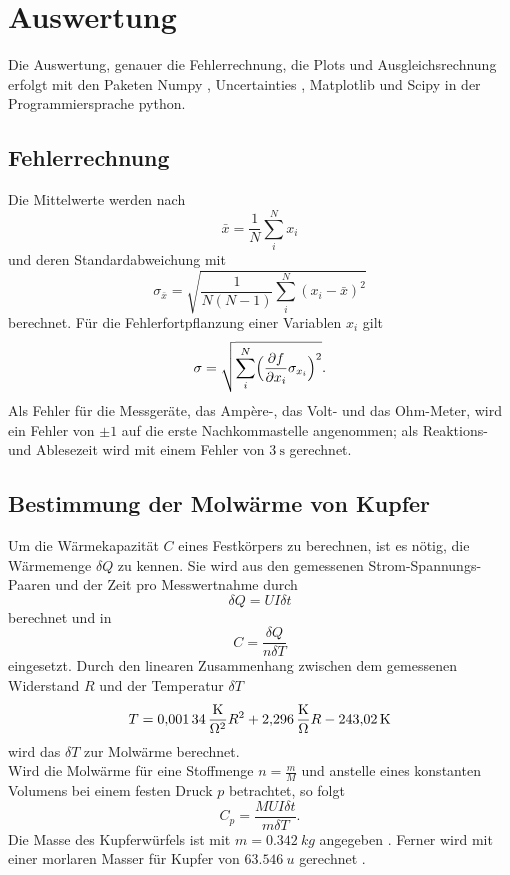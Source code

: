 \section{Auswertung}
Die Auswertung, genauer die Fehlerrechnung, die Plots und Ausgleichsrechnung erfolgt mit den Paketen
Numpy \cite{numpy}, Uncertainties \cite{uncertainties}, Matplotlib \cite{matplotlib} und Scipy \cite{scipy} in der Programmiersprache python.
\subsection{Fehlerrechnung}
Die Mittelwerte werden nach
\begin{equation}
	\bar{x}=\frac{1}{N}\sum_{i}^N x_i
\end{equation}
und deren Standardabweichung mit
\begin{equation}
	\sigma_{\bar{x}} = \sqrt{\frac{1}{N(N-1)} \sum_{i}^N (x_i-\bar{x})^2}
\end{equation}
berechnet.
Für die Fehlerfortpflanzung einer Variablen $x_i$ gilt
\begin{equation}
	\sigma = \sqrt{\sum_{i}^N \Bigl(\frac{\partial f}{\partial x_i} \sigma_{x_i}\Bigr)^2}.
	\label{eq:gaussfehler}
\end{equation}
Als Fehler für die Messgeräte, das Amp\`{e}re-, das Volt- und das Ohm-Meter, wird ein Fehler von $\pm 1$ auf die erste Nachkommastelle angenommen;
als Reaktions- und Ablesezeit wird mit einem Fehler von $\SI{3}{\second}$ gerechnet.

\subsection{Bestimmung der Molwärme von Kupfer}

Um die Wärmekapazität $C$ eines Festkörpers zu berechnen, ist es nötig, die Wärmemenge $\delta Q$ zu kennen.
Sie wird aus den gemessenen Strom-Spannungs-Paaren und der Zeit pro Messwertnahme durch
\begin{equation}
  \delta Q = U I \delta t
\end{equation}
berechnet und in
\begin{equation}
  C=\frac{\delta Q}{n\delta T}
\end{equation}
eingesetzt.
Durch den linearen Zusammenhang zwischen dem gemessenen Widerstand $R$ und der Temperatur $\delta T$
\begin{equation}
  T=\SI{0,00134}{\frac{K}{\ohm^2}} R^2 + \SI{2,296}{\frac{K}{\ohm}} R - \SI{243,02}{K}
\end{equation}
wird das $\delta T$ zur Molwärme berechnet.\\
Wird die Molwärme für eine Stoffmenge $n= \frac{m}{M}$ und anstelle eines konstanten Volumens bei einem festen Druck $p$ betrachtet,
so folgt
\begin{equation}
  C_p=\frac{MUI\delta t}{m\delta T}.
\end{equation}
Die Masse des Kupferwürfels ist mit $m=\SI{0,342}{kg}$ angegeben \cite{anleitung}.
Ferner wird mit einer morlaren Masser für Kupfer von $\SI{63,546}{u}$ gerechnet \cite{molaremassecu}.\\


